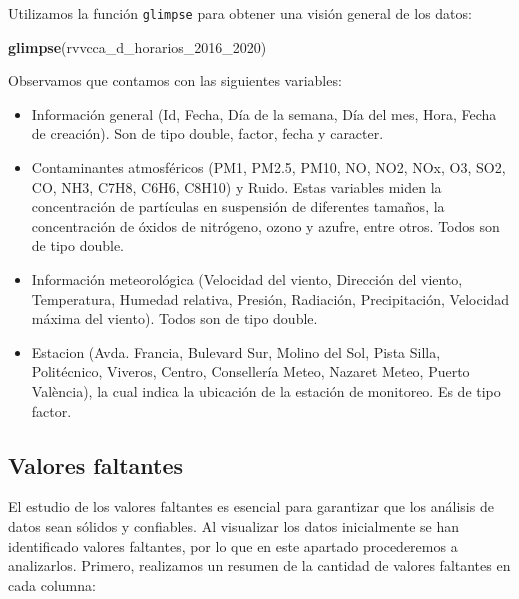 \documentclass[
]{article}
\newenvironment{Shaded}{\begin{snugshade}}{\end{snugshade}}
\newcommand{\FunctionTok}[1]{\textcolor[rgb]{0.13,0.29,0.53}{\textbf{#1}}}
\newcommand{\NormalTok}[1]{#1}
\begin{document}
Utilizamos la función \texttt{glimpse} para obtener una visión general
de los datos:

\begin{Shaded}
\begin{Highlighting}[]
\FunctionTok{glimpse}\NormalTok{(rvvcca\_d\_horarios\_2016\_2020)}
\end{Highlighting}
\end{Shaded}

Observamos que contamos con las siguientes variables:

\begin{itemize}
\item
  Información general (Id, Fecha, Día de la semana, Día del mes, Hora,
  Fecha de creación). Son de tipo double, factor, fecha y caracter.
\item
  Contaminantes atmosféricos (PM1, PM2.5, PM10, NO, NO2, NOx, O3, SO2,
  CO, NH3, C7H8, C6H6, C8H10) y Ruido. Estas variables miden la
  concentración de partículas en suspensión de diferentes tamaños, la
  concentración de óxidos de nitrógeno, ozono y azufre, entre otros.
  Todos son de tipo double.
\item
  Información meteorológica (Velocidad del viento, Dirección del viento,
  Temperatura, Humedad relativa, Presión, Radiación, Precipitación,
  Velocidad máxima del viento). Todos son de tipo double.
\item
  Estacion (Avda. Francia, Bulevard Sur, Molino del Sol, Pista Silla,
  Politécnico, Viveros, Centro, Consellería Meteo, Nazaret Meteo, Puerto
  València), la cual indica la ubicación de la estación de monitoreo. Es
  de tipo factor.
\end{itemize}

\hypertarget{valores-faltantes}{%
\subsection{Valores faltantes}\label{valores-faltantes}}

El estudio de los valores faltantes es esencial para garantizar que los
análisis de datos sean sólidos y confiables. Al visualizar los datos
inicialmente se han identificado valores faltantes, por lo que en este
apartado procederemos a analizarlos. Primero, realizamos un resumen de
la cantidad de valores faltantes en cada columna:
\end{document}
